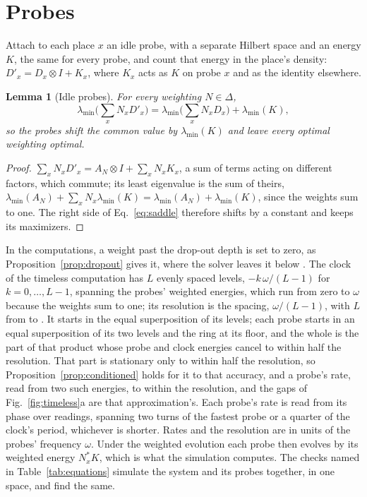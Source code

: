 \documentclass[aps,prd,reprint,superscriptaddress]{revtex4-2}
\newtheorem{lemma}{Lemma}
\begin{document}
\section{Probes}
\label{app:probes}

Attach to each place $x$ an idle probe, with a separate Hilbert space and an energy $K$, the same for every probe, and count that energy in the place's density: $D'_x = D_x \otimes I + K_x$, where $K_x$ acts as $K$ on probe $x$ and as the identity elsewhere.

\begin{lemma}[Idle probes]\label{lem:probes}
For every weighting $N \in \Delta$,
\begin{equation}
  \lambda_{\min}\Big(\sum_x N_x D'_x\Big) = \lambda_{\min}\Big(\sum_x N_x D_x\Big) + \lambda_{\min}(K),
  \label{eq:probes}
\end{equation}
so the probes shift the common value by $\lambda_{\min}(K)$ and leave every optimal weighting optimal.
\end{lemma}
\begin{proof}
$\sum_x N_x D'_x = A_N \otimes I + \sum_x N_x K_x$, a sum of terms acting on different factors, which commute; its least eigenvalue is the sum of theirs, $\lambda_{\min}(A_N) + \sum_x N_x \lambda_{\min}(K) = \lambda_{\min}(A_N) + \lambda_{\min}(K)$, since the weights sum to one. The right side of Eq.~\eqref{eq:saddle} therefore shifts by a constant and keeps its maximizers.
\end{proof}

In the computations, a weight past the drop-out depth is set to zero, as Proposition~\ref{prop:dropout} gives it, where the solver leaves it below . The clock of the timeless computation has $L$ evenly spaced levels, $-k\,\omega/(L-1)$ for $k = 0, \dots, L-1$, spanning the probes' weighted energies, which run from zero to $\omega$ because the weights sum to one; its resolution is the spacing, $\omega/(L-1)$, with $L$ from  to . It starts in the equal superposition of its levels; each probe starts in an equal superposition of its two levels and the ring at its floor, and the whole is the part of that product whose probe and clock energies cancel to within half the resolution. That part is stationary only to within half the resolution, so Proposition~\ref{prop:conditioned} holds for it to that accuracy, and a probe's rate, read from two such energies, to within the resolution, and the gaps of Fig.~\ref{fig:timeless}a are that approximation's. Each probe's rate is read from its phase over  readings, spanning two turns of the fastest probe or a quarter of the clock's period, whichever is shorter. Rates and the resolution are in units of the probes' frequency $\omega$. Under the weighted evolution each probe then evolves by its weighted energy $N^*_x K$, which is what the simulation computes. The checks named in Table~\ref{tab:equations} simulate the system and its probes together, in one space, and find the same.
\end{document}
